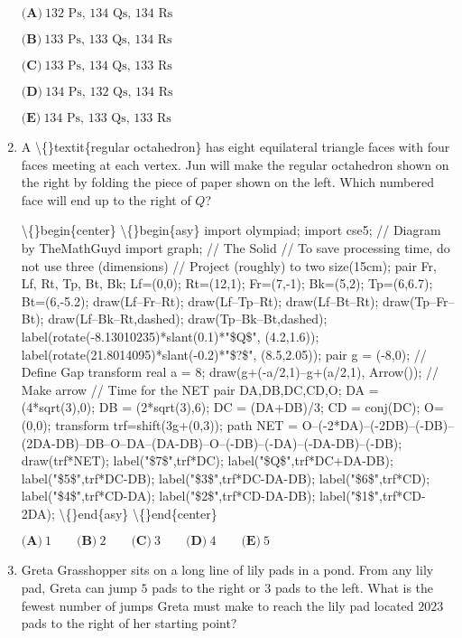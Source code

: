 \documentclass{article}
\begin{document}
\begin{enumerate}[label=\arabic*., itemsep=0.5em]
\(\textbf{(A)}~132\text{ Ps, }134\text{ Qs, }134\text{ Rs}\) 

\(\textbf{(B)}~133\text{ Ps, }133\text{ Qs, }134\text{ Rs}\)

\(\textbf{(C)}~133\text{ Ps, }134\text{ Qs, }133\text{ Rs}\)

\(\textbf{(D)}~134\text{ Ps, }132\text{ Qs, }134\text{ Rs}\)

\(\textbf{(E)}~134\text{ Ps, }133\text{ Qs, }133\text{ Rs}\)\par \vspace{0.5em}\item A \textbackslash\{\}textit\{regular octahedron\} has eight equilateral triangle faces with four faces meeting at each vertex. Jun will make the regular octahedron shown on the right by folding the piece of paper shown on the left. Which numbered face will end up to the right of \(Q\)?


\textbackslash\{\}begin\{center\}
\textbackslash\{\}begin\{asy\}
import olympiad;
import cse5;
// Diagram by TheMathGuyd
import graph;
// The Solid
// To save processing time, do not use three (dimensions)
// Project (roughly) to two
size(15cm);
pair Fr, Lf, Rt, Tp, Bt, Bk;
Lf=(0,0);
Rt=(12,1);
Fr=(7,-1);
Bk=(5,2);
Tp=(6,6.7);
Bt=(6,-5.2);
draw(Lf--Fr--Rt);
draw(Lf--Tp--Rt);
draw(Lf--Bt--Rt);
draw(Tp--Fr--Bt);
draw(Lf--Bk--Rt,dashed);
draw(Tp--Bk--Bt,dashed);
label(rotate(-8.13010235)*slant(0.1)*"\$Q\$", (4.2,1.6));
label(rotate(21.8014095)*slant(-0.2)*"\$?\$", (8.5,2.05));
pair g = (-8,0); // Define Gap transform
real a = 8;
draw(g+(-a/2,1)--g+(a/2,1), Arrow()); // Make arrow
// Time for the NET
pair DA,DB,DC,CD,O;
DA = (4*sqrt(3),0);
DB = (2*sqrt(3),6);
DC = (DA+DB)/3;
CD = conj(DC);
O=(0,0);
transform trf=shift(3g+(0,3));
path NET = O--(-2*DA)--(-2DB)--(-DB)--(2DA-DB)--DB--O--DA--(DA-DB)--O--(-DB)--(-DA)--(-DA-DB)--(-DB);
draw(trf*NET);
label("\$7\$",trf*DC);
label("\$Q\$",trf*DC+DA-DB);
label("\$5\$",trf*DC-DB);
label("\$3\$",trf*DC-DA-DB);
label("\$6\$",trf*CD);
label("\$4\$",trf*CD-DA);
label("\$2\$",trf*CD-DA-DB);
label("\$1\$",trf*CD-2DA);
\textbackslash\{\}end\{asy\}
\textbackslash\{\}end\{center\}


\(\textbf{(A)}\ 1 \qquad \textbf{(B)}\ 2 \qquad \textbf{(C)}\ 3 \qquad \textbf{(D)}\ 4 \qquad \textbf{(E)}\ 5\)\par \vspace{0.5em}\item Greta Grasshopper sits on a long line of lily pads in a pond. From any lily pad, Greta can jump \(5\) pads to the right or \(3\) pads to the left. What is the fewest number of jumps Greta must make to reach the lily pad located \(2023\) pads to the right of her starting point?


\end{enumerate}
\end{document}
